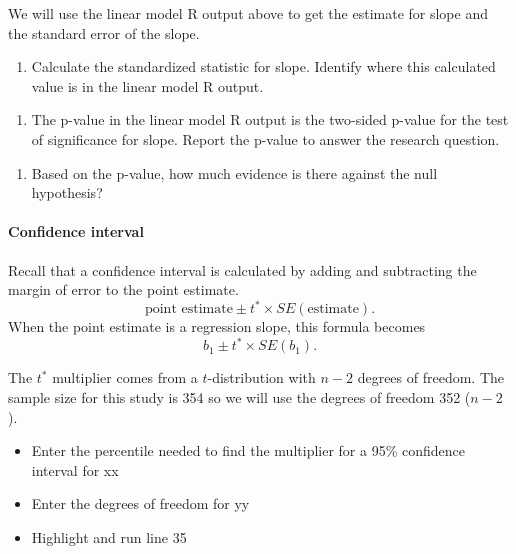 \documentclass[
]{report}
\providecommand{\tightlist}{%
  \setlength{\itemsep}{0pt}\setlength{\parskip}{0pt}}
\begin{document}
We will use the linear model R output above to get the estimate for slope and the standard error of the slope.

\begin{enumerate}
\def\labelenumi{\arabic{enumi}.}
\setcounter{enumi}{4}
\tightlist
\item
  Calculate the standardized statistic for slope. Identify where this calculated value is in the linear model R output.
\end{enumerate}

\vspace{0.7in}

\begin{enumerate}
\def\labelenumi{\arabic{enumi}.}
\setcounter{enumi}{5}
\tightlist
\item
  The p-value in the linear model R output is the two-sided p-value for the test of significance for slope. Report the p-value to answer the research question.
\end{enumerate}

\vspace{0.5in}

\begin{enumerate}
\def\labelenumi{\arabic{enumi}.}
\setcounter{enumi}{6}
\tightlist
\item
  Based on the p-value, how much evidence is there against the null hypothesis?
\end{enumerate}

\vspace{0.5in}

\paragraph*{Confidence interval}\label{confidence-interval-8}

Recall that a confidence interval is calculated by adding and subtracting the margin of error to the point estimate.\\
\[\mbox{point estimate}\pm t^*\times SE(\mbox{estimate}).\]
When the point estimate is a regression slope, this formula becomes
\[b_1 \pm t^* \times SE(b_1).\]

The \(t^*\) multiplier comes from a \(t\)-distribution with \(n-2\) degrees of freedom. The sample size for this study is 354 so we will use the degrees of freedom 352 (\(n-2\)).

\begin{itemize}
\item
  Enter the percentile needed to find the multiplier for a 95\% confidence interval for xx
\item
  Enter the degrees of freedom for yy
\item
  Highlight and run line 35
\end{itemize}
\end{document}
